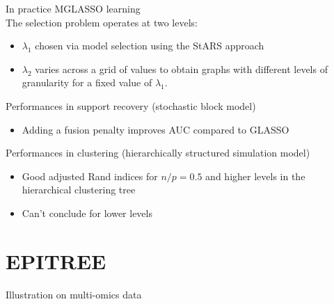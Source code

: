 \documentclass[11pt]{beamer}
\newcommand{\prune}[1]{\textcolor{Framaprunelight}{#1}}
\begin{document}
\begin{frame}{In practice}
\textcolor{Framaprune}{MGLASSO learning}  \\
The selection problem operates at two levels:
\begin{itemize}
	\item $\lambda_1$ chosen via model selection using the StARS approach 
	\item $\lambda_2$ varies across a grid of values to obtain graphs with different levels of granularity for a fixed value of $\lambda_1.$
\end{itemize} 

\begin{block}{Performances in support recovery (stochastic block model)}
	\begin{itemize}
		\item Adding a fusion penalty improves AUC compared to GLASSO 
	\end{itemize} 
\end{block}

\begin{block}{Performances in clustering (hierarchically structured simulation model)}
	\begin{itemize}
		\item Good adjusted Rand indices for $n/p = 0.5$ and higher levels in the hierarchical clustering tree
		\item Can't conclude for lower levels 
	\end{itemize} 
\end{block}


\end{frame}



\section{EPITREE}
\begin{frame}{}
\begin{center}
\Huge{\prune{Illustration on multi-omics data}}
\end{center}

\end{frame}
\end{document}
